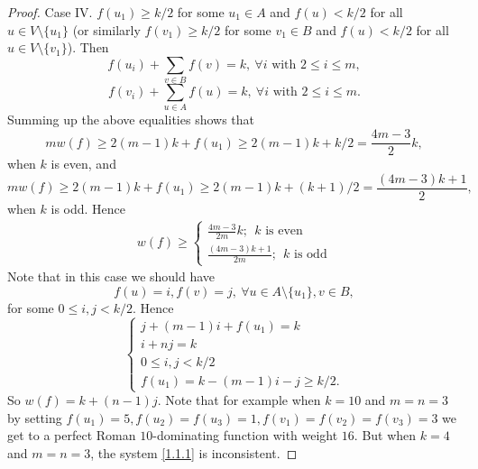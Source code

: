 \documentclass[12pt]{amsart}
\begin{document}
\begin{proof}
Case IV. $f(u_1)\geq k/2$ for some $u_1\in A$ and $f(u)<k/2$ for all $u\in V\setminus \{u_1\}$ (or similarly $f(v_1)\geq k/2$ for some $v_1\in B$ and $f(u)<k/2$ for all $u\in V\setminus \{v_1\}$). Then 
$$f(u_i)+\sum_{v\in B}f(v)=k, \ \forall i \textrm{ with } 2\leq i \leq m,$$
$$f(v_i)+\sum_{u\in A}f(u)=k, \ \forall i \textrm{ with } 2\leq i \leq m.$$
Summing up the above equalities shows that
$$mw(f)\geq 2(m-1)k+f(u_1)\geq 2(m-1)k+k/2=\frac{4m-3}{2}k,$$
when $k$ is even, and
$$mw(f)\geq 2(m-1)k+f(u_1)\geq 2(m-1)k+(k+1)/2=\frac{(4m-3)k+1}{2},$$
when $k$ is odd.
Hence
\begin{align*}
w(f)\geq \left\lbrace\begin{array}{c}
\frac{4m-3}{2m}k; \ \ k \textrm{ is even} \\ 
\frac{(4m-3)k+1}{2m}; \ \ k \textrm{ is odd}
\end{array} \right.
\end{align*}
Note that in this case we should have 
$$f(u)=i, f(v)=j, \ \forall u \in A\setminus \{u_1\}, v\in B,$$
for some $0\leq i,j <k/2$. Hence 
\begin{equation}\label{1.1.1}
\left\lbrace \begin{array}{l}
j+(m-1)i+f(u_1)=k\\ 
i+nj=k \\ 
0\leq i,j < k/2\\ 
 f(u_1)=k-(m-1)i-j\geq k/2.
\end{array}\right.
\end{equation}
So $w(f)=k+(n-1)j$. Note that for example when $k=10$ and $m=n=3$ by setting $f(u_1)=5, f(u_2)=f(u_3)=1, f(v_1)=f(v_2)=f(v_3)=3$ we get to a perfect Roman $10$-dominating function with weight $16$. But when $k=4$ and $m=n=3$, the system \ref{1.1.1} is inconsistent.


\end{proof}
\end{document}
